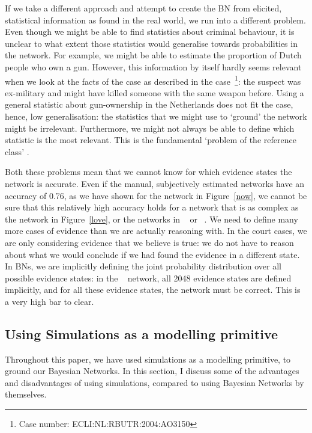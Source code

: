 \documentclass[12pt]{article}
\begin{document}
If we take a different approach and attempt to create the BN from elicited, statistical information as found in the real world, we run into a different problem. Even though we might be able to find statistics about criminal behaviour, it is unclear to what extent those statistics would generalise towards probabilities in the network. For example, we might be able to estimate the proportion of Dutch people who own a gun. However, this information by itself hardly seems relevant when we look at the facts of the case as described in the case~\footnote{Case number: ECLI:NL:RBUTR:2004:AO3150}: the suspect was ex-military and might have killed someone with the same weapon before. Using a general statistic about gun-ownership in the Netherlands does not fit the case, hence, low generalisation: the statistics that we might use to `ground' the network might be irrelevant. Furthermore, we might not always be able to define which statistic is the most relevant. This is the fundamental `problem of the reference class' \citep{colyvan2001}.

Both these problems mean that we cannot know for which evidence states the network is accurate. Even if the manual, subjectively estimated networks have an accuracy of 0.76, as we have shown for the network in Figure~\ref{now}, we cannot be sure that this relatively high accuracy holds for a network that is as complex as the network in Figure~\ref{love}, or the networks in ~\citet{vlek2016} or ~\citet{Fenton2019}.
 We need to define many more cases of evidence than we are actually reasoning with. In the court cases, we are only considering evidence that we believe is true: we do not have to reason about what we would conclude if we had found the evidence in a different state. In BNs, we are implicitly defining the joint probability distribution over all possible evidence states: in the ~\citep{vanLeeuwen2019} network, all 2048 evidence states are defined implicitly, and for all these evidence states, the network must be correct. This is a very high bar to clear.


                                                                                                                                                                      
\subsection{Using Simulations as a modelling primitive}
Throughout this paper, we have used simulations as a modelling primitive, to ground our Bayesian Networks. In this section, I discuss some of the advantages and disadvantages of using simulations, compared to using Bayesian Networks by themselves.
\end{document}
